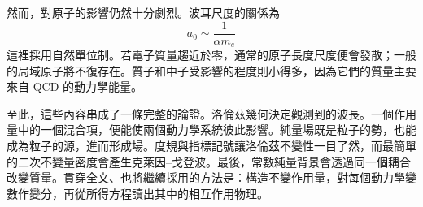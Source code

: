 \begin{classroomqa}
\end{classroomqa}

\begin{classroomqa}
\end{classroomqa}

\begin{classroomqa}
\end{classroomqa}

然而，對原子的影響仍然十分劇烈。波耳尺度的關係為
\begin{equation}
a_0\sim\frac{1}{\alpha m_e}
\end{equation}
這裡採用自然單位制。若電子質量趨近於零，通常的原子長度尺度便會發散；一般的局域原子將不復存在。質子和中子受影響的程度則小得多，因為它們的質量主要來自 QCD 的動力學能量。

至此，這些內容串成了一條完整的論證。洛倫茲幾何決定觀測到的波長。一個作用量中的一個混合項，便能使兩個動力學系統彼此影響。純量場既是粒子的勢，也能成為粒子的源，進而形成場。度規與指標記號讓洛倫茲不變性一目了然，而最簡單的二次不變量密度會產生克萊因--戈登波。最後，常數純量背景會透過同一個耦合改變質量。貫穿全文、也將繼續採用的方法是：構造不變作用量，對每個動力學變數作變分，再從所得方程讀出其中的相互作用物理。